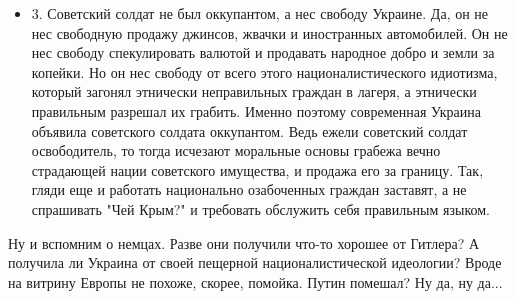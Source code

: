\begin{itemize}
\item 3. Советский солдат не был оккупантом, а нес свободу Украине. Да, он не нес
свободную продажу джинсов, жвачки и иностранных автомобилей. Он
не нес свободу спекулировать валютой и продавать народное добро
и земли за копейки. Но он нес свободу от всего этого
националистического идиотизма, который загонял этнически
неправильных граждан в лагеря, а этнически правильным разрешал
их грабить.  Именно поэтому современная Украина объявила
советского солдата оккупантом. Ведь ежели советский солдат
освободитель, то тогда исчезают моральные основы грабежа вечно
страдающей нации советского имущества, и продажа его за
границу. Так, гляди еще и работать национально озабоченных
граждан заставят, а не спрашивать "Чей Крым?" и требовать
обслужить себя правильным языком. 

\end{itemize}

Ну и вспомним о немцах. Разве они получили что-то хорошее от Гитлера? А получила ли Украина от своей пещерной националистической идеологии? Вроде на витрину Европы не похоже, скорее, помойка. Путин помешал? Ну да, ну да...


